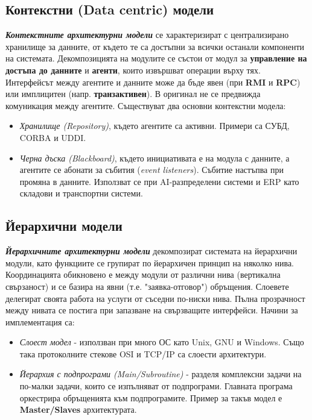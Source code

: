 \documentclass[fleqn,12pt]{article}
\begin{document}
\subsection{Контекстни (Data centric) модели}

\textbf{\textit{Контекстните архитектурни модели}} се характеризират с централизирано хранилище за данните, от където те са достъпни за всички останали компоненти на системата.
Декомпозицията на модулите се състои от модул за \textbf{управление на достъпа до данните} и \textbf{агенти}, които извършват операции върху тях.
\bigbreak
Интерфейсът между агентите и данните може да бъде явен (при \textbf{RMI} и \textbf{RPC}) или имплицитен (напр. \textbf{транзактивен}).
В оригинал не се предвижда комуникация между агентите.
\bigbreak
Съществуват два основни контекстни модела:
\begin{itemize}
    \item \textit{Хранилище (Repository)}, където агентите са активни. Примери са СУБД, CORBA и UDDI.
    \item \textit{Черна дъска (Blackboard)}, където инициативата е на модула с данните, а агентите се абонати за събития (\textit{event listeners}).
    Събитие настъпва при промяна в данните.
    Използват се при AI-разпределени системи и ERP като складови и транспортни системи.
\end{itemize}

\subsection{Йерархични модели}

\textbf{\textit{Йерархичните архитектурни модели}} декомпозират системата на йерархични модули, като функциите се групират по йерархичен принцип на няколко нива.
Координацията обикновено е между модули от различни нива (вертикална свързаност) и се базира на явни (т.е. "заявка-отговор") обръщения.
Слоевете делегират своята работа на услуги от съседни по-ниски нива.
Пълна прозрачност между нивата се постига при запазване на свързващите интерфейси.
\bigbreak
Начини за имплементация са:
\begin{itemize}
    \item \textit{Слоест модел} - използван при много ОС като Unix, GNU и Windows.
    Също така протоколните стекове OSI и TCP/IP са слоести архитектури.
    \item \textit{Йерархия с подпрограми (Main/Subroutine)} - разделя комплексни задачи на по-малки задачи, които се изпълняват от подпрограми.
    Главната програма оркестрира обръщенията към подпрограмите.
    Пример за такъв модел е \textbf{Master/Slaves} архитектурата.
\end{itemize}
\end{document}
